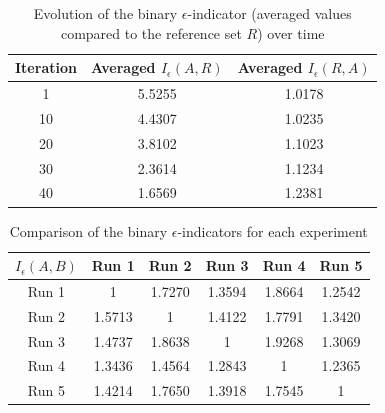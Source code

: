 \begin{table}[h!]
\begin{center}
\begin{small}
\begin{tabular}{|c|c|c|}
\hline Iteration & Averaged $I_\epsilon(A,R)$ & Averaged $I_\epsilon(R,A)$\\
\hline 1 & 5.5255 & 1.0178\\
\hline 10 & 4.4307 & 1.0235\\
\hline 20 & 3.8102 & 1.1023\\
\hline 30 & 2.3614 & 1.1234\\
\hline 40 & 1.6569 & 1.2381\\
\hline
\end{tabular}
\end{small}
\end{center}
\caption{Evolution of the binary $\epsilon$-indicator (averaged values compared to the reference set $R$) over time}
\label{tab:biepsref}
\end{table}

\begin{table}[h!]
\begin{center}
\begin{footnotesize}
\begin{tabular}{|c|c|c|c|c|c|}
\hline $I_\epsilon(A,B)$ & Run 1 & Run 2 & Run 3 & Run 4 & Run 5 \\ 
\hline Run 1 & 1 & 1.7270 & 1.3594 & 1.8664 & 1.2542 \\ 
\hline Run 2 & 1.5713 & 1 & 1.4122 & 1.7791 & 1.3420 \\ 
\hline Run 3 & 1.4737 & 1.8638 & 1 & 1.9268 & 1.3069 \\ 
\hline Run 4 & 1.3436 & 1.4564 & 1.2843 & 1 & 1.2365 \\ 
\hline Run 5 & 1.4214 & 1.7650 & 1.3918 & 1.7545 & 1 \\ 
\hline 
\end{tabular} 
\end{footnotesize}
\end{center}
\caption{Comparison of the binary $\epsilon$-indicators for each experiment}
\label{tab:biepsxp}
\end{table}

